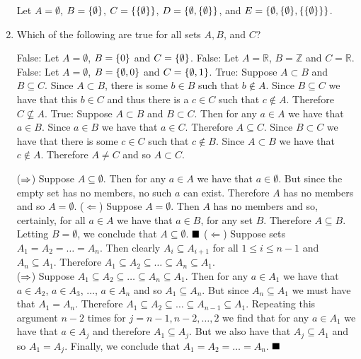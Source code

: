 \documentclass[11pt]{book}
\begin{document}
\begin{enumerate}
{Let $A = \emptyset$, $B = \set{\emptyset}$, $C = \set{\set{\emptyset}}$, $D = \set{\emptyset, \set{\emptyset}}$, and $E = \set{\emptyset, \set{\emptyset}, \set{\set{\emptyset}}}$.}
\item Which of the following are true for all sets $A, B$, and $C$?
	\begin{enumerate}
	{False: Let $A = \emptyset$, $B = \set{0}$ and $C = \set{\emptyset}$.}
	{False: Let $A = \mathbb{R}$, $B = \mathbb{Z}$ and $C = \mathbb{R}$.}
	{False: Let $A = \emptyset$, $B = \set{\emptyset, 0}$ and $C = \set{\emptyset, 1}$.}
	{True: Suppose $A \subset B$ and $B \subseteq C$. Since $A \subset B$, there is some $b \in B$ such that $b \notin A$. Since $B \subseteq C$ we have that this $b \in C$ and thus there is a $c \in C$ such that $c \notin A$. Therefore $C \not\subseteq A$.}
	{True: Suppose $A \subset B$ and $B \subset C$. Then for any $a \in A$ we have that $a \in B$. Since $a \in B$ we have that $a \in C$. Therefore $A \subseteq C$. Since $B \subset C$ we have that there is some $c \in C$ such that $c \notin B$. Since $A \subset B$ we have that $c \notin A$. Therefore $A \neq C$ and so $A \subset C$.}
	\end{enumerate}
{($\then$) Suppose $A \subseteq \emptyset$. Then for any $a \in A$ we have that $a \in \emptyset$. But since the empty set has no members, no such $a$ can exist. Therefore $A$ has no members and so $A = \emptyset$. ($\Leftarrow$) Suppose $A = \emptyset$. Then $A$ has no members and so, certainly, for all $a \in A$ we have that $a \in B$, for any set $B$. Therefore $A \subseteq B$. Letting $B = \emptyset$, we conclude that $A \subseteq \emptyset$. $\qed$}
{($\Leftarrow$) Suppose sets $A_1 = A_2 = \dots = A_n$. Then clearly $A_i \subseteq A_{i+1}$ for all $1 \leq i \leq n - 1$ and $A_n \subseteq A_1$. Therefore $A_1 \subseteq A_2 \subseteq \dots \subseteq A_n \subseteq A_1$.\\ ($\then$) Suppose $A_1 \subseteq A_2 \subseteq \dots \subseteq A_n \subseteq A_1$. Then for any $a \in A_1$ we have that $a \in A_2$, $a \in A_3$, $\dots$, $a \in A_n$ and so $A_1 \subseteq A_n$. But since $A_n \subseteq A_1$ we must have that $A_1 = A_n$. Therefore $A_1 \subseteq A_2 \subseteq \dots \subseteq A_{n-1} \subseteq A_1$. Repeating this argument $n - 2$ times for $j = n - 1, n - 2, \dots, 2$ we find that for any $a \in A_1$ we have that $a \in A_j$ and therefore $A_1 \subseteq A_j$. But we also have that $A_j \subseteq A_1$ and so $A_1 = A_j$. Finally, we conclude that $A_1 = A_2 = \dots = A_n$. $\qed$}

\end{enumerate}
\end{document}
